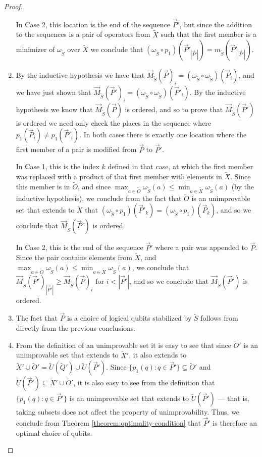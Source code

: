\documentclass{amsbook}
\theoremstyle{plain}
\theoremstyle{definition}
\theoremstyle{remark}
\newcommand{\lst}{\vec}
\newcommand{\set}{\tilde}
\newcommand{\om}{\omega}
\begin{document}
\begin{proof}
\begin{enumerate}
In Case 2, this location is the end of the sequence $\lst P'$, but since the addition to the sequences is a pair of operators from $\set X$ such that the first member is a minimizer of $\om_{\set S}$ over $\set X$ we conclude that $(\om_{\set S}\circ p_1)(\lst P'_{|\lst P'|})=m_{\set S}(\lst P'_{|\lst P'|})$.
\item

By the inductive hypothesis we have that $\lst M_{\set S}(\lst P)_i=(\om_{\set S}\circ \om_{\set S})(\lst P_i)$, and we have just shown that $\lst M_{\set S}(\lst P')_i=(\om_{\set S}\circ \om_{\set S})(\lst P'_i)$.  By the inductive hypothesis we know that $\lst M_{\set S}(\lst P)$ is ordered, and so to prove that $\lst M_{\set S}(\lst P')$ is ordered we need only check the places in the sequence where $p_1(\lst P_i)\ne p_1(\lst P'_i)$.  In both cases there is exactly one location where the first member of a pair is modified from $\lst P$ to $\lst P'$.

In Case 1, this is the index $k$ defined in that case, at which the first member was replaced with a product of that first member with elements in $\set X$.  Since this member is in $\set O$, and since $\max_{a\in\set O}\om_{\set S}(a)\le\min_{a\in\set X}\om_{\set S}(a)$ (by the inductive hypothesis), we conclude from the fact that $\set O$ is an unimprovable set that extends to $\set X$ that $(\om_{\set S}\circ p_1)(\lst P'_k)=(\om_{\set S}\circ p_1)(\lst P_k)$, and so we conclude that $\lst M_{\set S}(\lst P')$ is ordered.

In Case 2, this is the end of the sequence $\lst P'$ where a pair was appended to $\lst P$.  Since the pair contains elements from $\set X$, and $\max_{a\in\set O}\om_{\set S}(a)\le\min_{a\in\set X}\om_{\set S}(a)$, we conclude that $\lst M_{\set S}(\lst P')_{|\lst P'|}\ge\lst M_{\set S}(\lst P)_i$ for $i<|\lst P'|$, and so we conclude that $\lst M_{\set S}(\lst P')$ is ordered.
\item

The fact that $\lst P$ is a choice of logical qubits stabilized by $\set S$ follows from directly from the previous conclusions.
\item

From the definition of an unimprovable set it is easy to see that since $\set O'$ is an unimprovable set that extends to $\set X'$, it also extends to $\set X'\cup\set O'=\set U(\set Q')\cup\set U(\lst P')$.  Since $\{p_1(q):q\in\lst P'\}\subseteq \set O'$ and $\set U(\lst P')\subseteq \set X'\cup\set O'$, it is also easy to see from the definition that $\{p_1(q):q\in\lst P'\}$ is an unimprovable set that extends to $\set U(\lst P')$ --- that is, taking subsets does not affect the property of unimprovability.  Thus, we conclude from Theorem \ref{theorem:optimality-condition} that $\lst P'$ is therefore an optimal choice of qubits.
\end{enumerate}
\end{proof}
\end{document}
